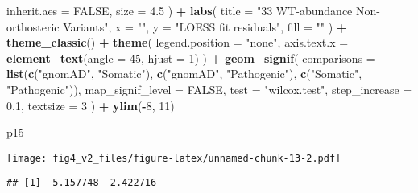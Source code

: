 \documentclass[
]{article}
\newenvironment{Shaded}{\begin{snugshade}}{\end{snugshade}}
\newcommand{\AttributeTok}[1]{\textcolor[rgb]{0.13,0.29,0.53}{#1}}
\newcommand{\ConstantTok}[1]{\textcolor[rgb]{0.56,0.35,0.01}{#1}}
\newcommand{\DecValTok}[1]{\textcolor[rgb]{0.00,0.00,0.81}{#1}}
\newcommand{\FloatTok}[1]{\textcolor[rgb]{0.00,0.00,0.81}{#1}}
\newcommand{\FunctionTok}[1]{\textcolor[rgb]{0.13,0.29,0.53}{\textbf{#1}}}
\newcommand{\NormalTok}[1]{#1}
\newcommand{\SpecialCharTok}[1]{\textcolor[rgb]{0.81,0.36,0.00}{\textbf{#1}}}
\newcommand{\StringTok}[1]{\textcolor[rgb]{0.31,0.60,0.02}{#1}}
\begin{document}
\begin{Shaded}
\begin{Highlighting}[]
    \AttributeTok{inherit.aes =} \ConstantTok{FALSE}\NormalTok{,}
    \AttributeTok{size =} \FloatTok{4.5}
\NormalTok{  ) }\SpecialCharTok{+}
  \FunctionTok{labs}\NormalTok{(}
    \AttributeTok{title =} \StringTok{"33 WT{-}abundance Non{-}orthosteric Variants"}\NormalTok{,}
    \AttributeTok{x =} \StringTok{""}\NormalTok{,}
    \AttributeTok{y =} \StringTok{"LOESS fit residuals"}\NormalTok{,}
    \AttributeTok{fill =} \StringTok{""}
\NormalTok{  ) }\SpecialCharTok{+}
  \FunctionTok{theme\_classic}\NormalTok{() }\SpecialCharTok{+}
  \FunctionTok{theme}\NormalTok{(}
    \AttributeTok{legend.position =} \StringTok{"none"}\NormalTok{,}
    \AttributeTok{axis.text.x =} \FunctionTok{element\_text}\NormalTok{(}\AttributeTok{angle =} \DecValTok{45}\NormalTok{, }\AttributeTok{hjust =} \DecValTok{1}\NormalTok{)}
\NormalTok{  ) }\SpecialCharTok{+}
  \FunctionTok{geom\_signif}\NormalTok{(}
    \AttributeTok{comparisons =} \FunctionTok{list}\NormalTok{(}\FunctionTok{c}\NormalTok{(}\StringTok{"gnomAD"}\NormalTok{, }\StringTok{"Somatic"}\NormalTok{), }
                       \FunctionTok{c}\NormalTok{(}\StringTok{"gnomAD"}\NormalTok{, }\StringTok{"Pathogenic"}\NormalTok{), }
                       \FunctionTok{c}\NormalTok{(}\StringTok{"Somatic"}\NormalTok{, }\StringTok{"Pathogenic"}\NormalTok{)),}
    \AttributeTok{map\_signif\_level =} \ConstantTok{FALSE}\NormalTok{,}
    \AttributeTok{test =} \StringTok{"wilcox.test"}\NormalTok{,}
    \AttributeTok{step\_increase =} \FloatTok{0.1}\NormalTok{,}
    \AttributeTok{textsize =} \DecValTok{3}
\NormalTok{  ) }\SpecialCharTok{+} \FunctionTok{ylim}\NormalTok{(}\SpecialCharTok{{-}}\DecValTok{8}\NormalTok{, }\DecValTok{11}\NormalTok{)}

\NormalTok{p15 }
\end{Highlighting}
\end{Shaded}

\texttt{[image: fig4\_v2\_files/figure-latex/unnamed-chunk-13-2.pdf]}

\begin{Shaded}
\end{Shaded}

\begin{verbatim}
## [1] -5.157748  2.422716
\end{verbatim}
\end{document}

